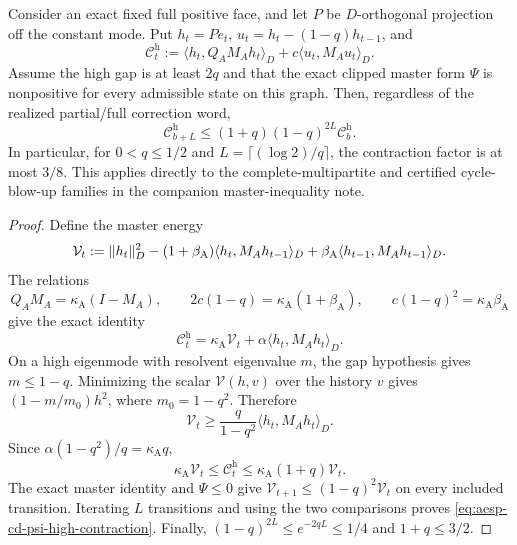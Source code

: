 \begin{proposition}
\label{prop:aesp-cd-psi-high-window}
Consider an exact fixed full positive face, and let $P$ be $D$-orthogonal
projection off the constant mode.  Put $h_t=Pe_t$,
$u_t=h_t-(1-q)h_{t-1}$, and
\begin{equation}
 \mathcal C_t^{\mathrm h}
 :=\langle h_t,Q_AM_Ah_t\rangle_D
   +c\langle u_t,M_Au_t\rangle_D.
 \label{eq:aesp-cd-psi-high-bank}
\end{equation}
Assume the high gap is at least $2q$ and that the exact clipped master form
$\Psi$ is nonpositive for every admissible state on this graph.  Then,
regardless of the realized partial/full correction word,
\begin{equation}
 \mathcal C_{b+L}^{\mathrm h}
 \leq(1+q)(1-q)^{2L}\mathcal C_b^{\mathrm h}.
 \label{eq:aesp-cd-psi-high-contraction}
\end{equation}
In particular, for $0<q\leq1/2$ and
$L=\lceil(\log 2)/q\rceil$, the contraction factor is at most $3/8$.
This applies directly to the complete-multipartite and certified
cycle-blow-up families in the companion master-inequality note.
\end{proposition}

\begin{proof}
Define the master energy
\begin{equation*}
 \mathcal V_t
 :=\lVert h_t\rVert_D^2
 -(1+\beta_{\mathrm A})\langle h_t,M_Ah_{t-1}\rangle_D
 +\beta_{\mathrm A}\langle h_{t-1},M_Ah_{t-1}\rangle_D.
\end{equation*}
The relations
\begin{equation*}
 Q_AM_A=\kappa_{\mathrm A}(I-M_A),\qquad
 2c(1-q)=\kappa_{\mathrm A}(1+\beta_{\mathrm A}),\qquad
 c(1-q)^2=\kappa_{\mathrm A}\beta_{\mathrm A}
\end{equation*}
give the exact identity
\begin{equation}
 \mathcal C_t^{\mathrm h}
 =\kappa_{\mathrm A}\mathcal V_t
  +\alpha\langle h_t,M_Ah_t\rangle_D.
 \label{eq:aesp-cd-psi-high-identity}
\end{equation}
On a high eigenmode with resolvent eigenvalue $m$, the gap hypothesis gives
$m\leq1-q$.  Minimizing the scalar $\mathcal V(h,v)$ over the history $v$
gives $(1-m/m_0)h^2$, where $m_0=1-q^2$.  Therefore
\begin{equation*}
 \mathcal V_t
 \geq\frac{q}{1-q^2}\langle h_t,M_Ah_t\rangle_D.
\end{equation*}
Since $\alpha(1-q^2)/q=\kappa_{\mathrm A}q$,
\begin{equation*}
 \kappa_{\mathrm A}\mathcal V_t
 \leq\mathcal C_t^{\mathrm h}
 \leq\kappa_{\mathrm A}(1+q)\mathcal V_t.
\end{equation*}
The exact master identity and $\Psi\leq0$ give
$\mathcal V_{t+1}\leq(1-q)^2\mathcal V_t$ on every included transition.
Iterating $L$ transitions and using the two comparisons proves
\cref{eq:aesp-cd-psi-high-contraction}.  Finally,
$(1-q)^{2L}\leq e^{-2qL}\leq1/4$ and $1+q\leq3/2$.
\end{proof}

